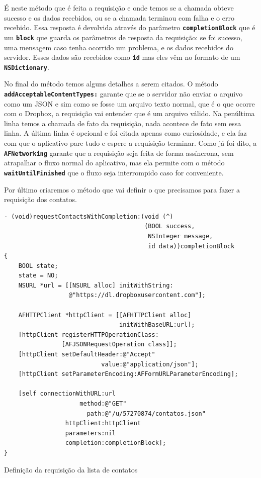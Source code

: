 \documentclass[a4paper,12pt,brazil,oneside]{book}
\begin{document}
É neste método que é feita a requisição e onde temos se a chamada obteve sucesso e os dados recebidos, ou se a chamada terminou com falha e o erro recebido. Essa resposta é devolvida através do parâmetro \texttt{\textbf{completionBlock}} que é um \texttt{\textbf{block}} que guarda os parâmetros de resposta da requisição: se foi sucesso, uma mensagem caso tenha ocorrido um problema, e os dados recebidos do servidor. Esses dados são recebidos como \texttt{\textbf{id}} mas eles vêm no formato de um \texttt{\textbf{NSDictionary}}.

No final do método temos alguns detalhes a serem citados. O método\\ \texttt{\textbf{addAcceptableContentTypes:}} garante que se o servidor não enviar o arquivo como um JSON e sim como se fosse um arquivo texto normal, que é o que ocorre com o Dropbox, a requisição vai entender que é um arquivo válido. Na penúltima linha temos a chamada de fato da requisição, nada acontece de fato sem essa linha. A última linha é opcional e foi citada apenas como curiosidade, e ela faz com que o aplicativo pare tudo e espere a requisição terminar. Como já foi dito, a \texttt{\textbf{AFNetworking}} garante que a requisição seja feita de forma assíncrona, sem atrapalhar o fluxo normal do aplicativo, mas ela permite com o método \texttt{\textbf{waitUntilFinished}} que o fluxo seja interrompido caso for conveniente.

Por último criaremos o método que vai definir o que precisamos para fazer a requisição dos contatos.

\begin{listing}[H]
\begin{verbatim}
- (void)requestContactsWithCompletion:(void (^)
                                       (BOOL success,
                                        NSInteger message,
                                        id data))completionBlock
{
    BOOL state;
    state = NO;
    NSURL *url = [[NSURL alloc] initWithString:
                  @"https://dl.dropboxusercontent.com"];
    
    AFHTTPClient *httpClient = [[AFHTTPClient alloc]
                                initWithBaseURL:url];
    [httpClient registerHTTPOperationClass:
                [AFJSONRequestOperation class]];
    [httpClient setDefaultHeader:@"Accept"
                           value:@"application/json"];
    [httpClient setParameterEncoding:AFFormURLParameterEncoding];
    
    [self connectionWithURL:url
                     method:@"GET"
                       path:@"/u/57270874/contatos.json"
                 httpClient:httpClient
                 parameters:nil
                 completion:completionBlock];
}
\end{verbatim}
\caption{Definição da requisição da lista de contatos}
\end{listing}
\end{document}
